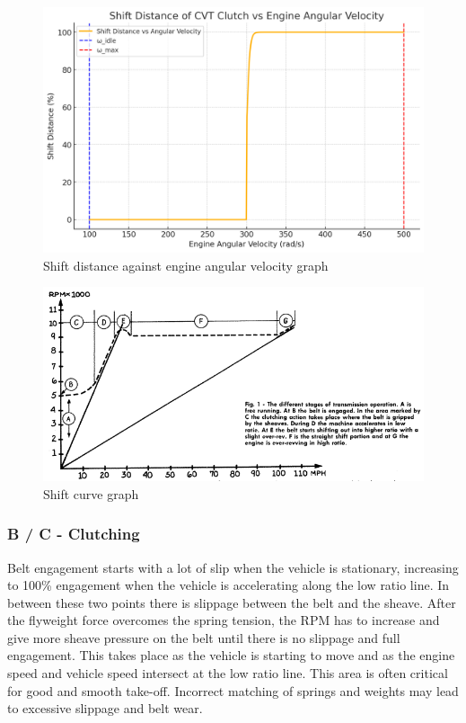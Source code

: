 \documentclass[12pt, titlepage]{article}
\begin{document}
\begin{figure}[H]
  \centering
  \includegraphics[width=\textwidth]{graphs/shift_vs_engine.png}
  \caption{Shift distance against engine angular velocity graph}
  \label{fig:shift_distance_graph}
\end{figure}

\begin{figure}[H]
  \centering
  \includegraphics[width=\textwidth]{graphs/shift_curve.png}
  \caption{Shift curve graph \citet{Aaen2007}}
  \label{fig:shift_curve}
\end{figure}

\subsubsection*{B / C - Clutching}

Belt engagement starts with a lot of slip when the vehicle is stationary, increasing to 100\% engagement when the vehicle is accelerating along the low ratio line. In between these two points there is slippage between the belt and the sheave. After the flyweight force overcomes the spring tension, the RPM has to increase and give more sheave pressure on the belt until there is no slippage and full engagement. This takes place as the vehicle is starting to move and as the engine speed and vehicle speed intersect at the low ratio line. This area is often critical for good and smooth take-off. Incorrect matching of springs and weights may lead to excessive slippage and belt wear.
\end{document}
